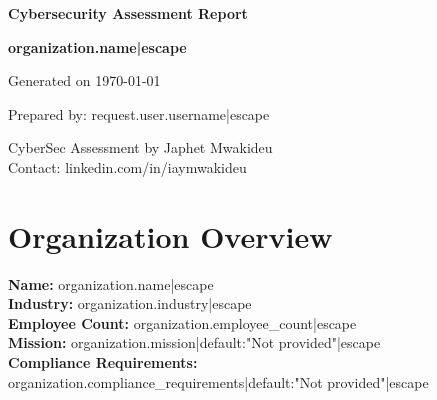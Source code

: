 \documentclass[a4paper,12pt]{article}
\begin{document}
   \begin{titlepage}
       \centering
       \vspace*{2cm}
       {\Huge \textbf{Cybersecurity Assessment Report}\par}
       \vspace{1cm}
       {\Large \textbf{{ organization.name|escape }}\par}
       \vspace{0.5cm}
       {\large Generated on \today \par}
       \vspace{2cm}
       {\large Prepared by: {{ request.user.username|escape }}\par}
       \vfill
       {\large CyberSec Assessment by Japhet Mwakideu \\ Contact: linkedin.com/in/iaymwakideu \par}
   \end{titlepage}

   \tableofcontents
   \newpage

   \section{Organization Overview}
   \textbf{Name:} {{ organization.name|escape }} \\
   \textbf{Industry:} {{ organization.industry|escape }} \\
   \textbf{Employee Count:} {{ organization.employee_count|escape }} \\
   \textbf{Mission:} {{ organization.mission|default:"Not provided"|escape }} \\
   \textbf{Compliance Requirements:} {{ organization.compliance_requirements|default:"Not provided"|escape }}
\end{document}
